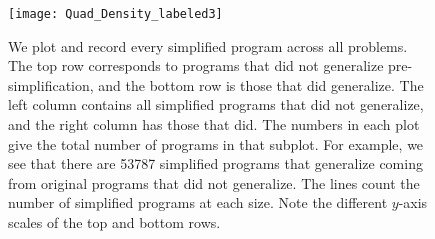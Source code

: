 


\begin{figure}[t] %
\centering
\texttt{[image: Quad\_Density\_labeled3]} %
\caption{We plot and record every simplified program across all problems. The top row corresponds to programs that did not generalize pre-simplification, and the bottom row is those that did generalize. The left column contains all simplified programs that did not generalize, and the right column has those that did. The numbers in each plot give the total number of programs in that subplot. For example, we see that there are 53787 simplified programs that generalize coming from original programs that did not generalize. The lines count the number of simplified programs at each size. Note the different $y$-axis scales of the top and bottom rows.}
\label{fig:count:quad}
\end{figure}

%

